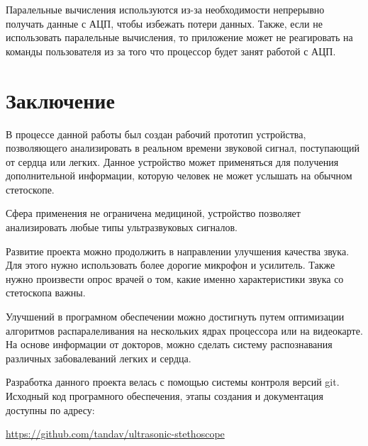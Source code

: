 \documentclass[14pt]{extarticle}
\begin{document}
Паралельные вычисления используются из-за необходимости непрерывно получать данные с АЦП, чтобы избежать потери данных. Также, если не использовать паралельные вычисления, то приложение может не реагировать на команды пользователя из за того что процессор будет занят работой с АЦП.

\newpage
\section{Заключение}
В процессе данной работы был создан рабочий прототип устройства, позволяющего анализировать в реальном времени звуковой сигнал, поступающий от сердца или легких. Данное устройство может применяться для получения дополнительной информации, которую человек не может услышать на обычном стетоскопе.

Сфера применения не ограничена медициной, устройство позволяет анализировать любые типы ультразвуковых сигналов.

Развитие проекта можно продолжить в направлении улучшения качества звука. Для этого нужно использовать более дорогие микрофон и усилитель. Также нужно произвести опрос врачей о том, какие именно характеристики звука со стетоскопа важны.

Улучшений в програмном обеспечении можно достигнуть путем оптимизации алгоритмов распаралеливания на нескольких ядрах процессора или на видеокарте. На основе информации от докторов, можно сделать систему распознавания различных забовалеваний легких и сердца.

Разработка данного проекта велась с помощью системы контроля версий git. Исходный код програмного обеспечения, этапы создания и документация доступны по адресу:

\url{https://github.com/tandav/ultrasonic-stethoscope}
\end{document}

